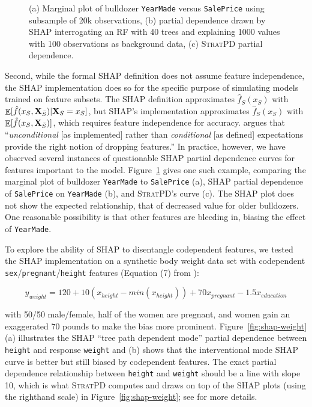 \documentclass[11pt]{article}
\newcommand{\figref}[1]{Figure~\ref{#1}}
\DeclareMathOperator{\Ex}{\mathbb{E}}
\newcommand{\spd}{\fontfamily{cmr}\textsc{\small StratPD}}
\begin{document}
\begin{figure}[htbp]
\begin{center}
\caption{\small (a) Marginal plot of bulldozer {\tt YearMade} versus {\tt SalePrice} using subsample of 20k observations, (b) partial dependence drawn by SHAP interrogating an RF with 40 trees and explaining 1000 values with 100 observations as background data, (c) \spd{} partial dependence.}
\label{fig:shap-stratpd-YearMade}
\end{center}
\end{figure}

Second, while the formal SHAP definition does not assume feature independence, the SHAP implementation does so for the specific purpose of simulating models trained on feature subsets. The SHAP definition approximates $\hat{f}_S(x_S)$ with $\Ex[\hat{f}(x_{S},{\bf X}_{\bar{S}}) | {\bf X}_S = x_S]$, but SHAP's implementation approximates $\hat{f}_S(x_S)$ with $\Ex[\hat{f}(x_{S},{\bf X}_{\bar{S}})]$, which requires feature independence for accuracy. \cite{janzing2019feature} argues that ``{\em unconditional} [as implemented] rather than {\em conditional} [as defined] expectations provide the right notion of dropping features.'' In practice, however, we have observed several instances of questionable SHAP partial dependence curves for features important to the model.  \figref{fig:shap-stratpd-YearMade} gives one such example, comparing the marginal plot of  bulldozer {\tt YearMade} to {\tt SalePrice} (a), SHAP partial dependence of {\tt SalePrice} on {\tt YearMade} (b), and \spd{}'s curve (c). The SHAP plot does not show the expected relationship, that of decreased value for older bulldozers. One reasonable possibility is that other features are bleeding in, biasing the effect of {\tt YearMade}.

To explore the ability of SHAP to disentangle codependent features, we tested the SHAP implementation on a synthetic body weight data set with codependent {\tt\small sex}/{\tt\small pregnant}/{\tt\small height} features (Equation (7) from \citealt{stratpd}):

\begin{equation}\label{eq:weight}
y_{weight}  = 120 + 10(x_{height} - min(x_{height})) + 70x_{pregnant} - 1.5x_{education}
\end{equation}

\noindent with 50/50 male/female, half of the women are pregnant, and women gain an exaggerated 70 pounds to make the bias more prominent. \figref{fig:shap-weight}(a) illustrates the SHAP ``tree path dependent mode'' partial dependence between {\tt height} and response {\tt weight} and (b) shows that the interventional mode SHAP curve is better but still biased by codependent features.  The exact partial dependence relationship between {\tt height} and {\tt weight} should be a line with slope 10, which is what \spd{} computes and draws on top of the SHAP plots (using the righthand scale) in \figref{fig:shap-weight}; see \citet{stratpd} for more details.
\end{document}
